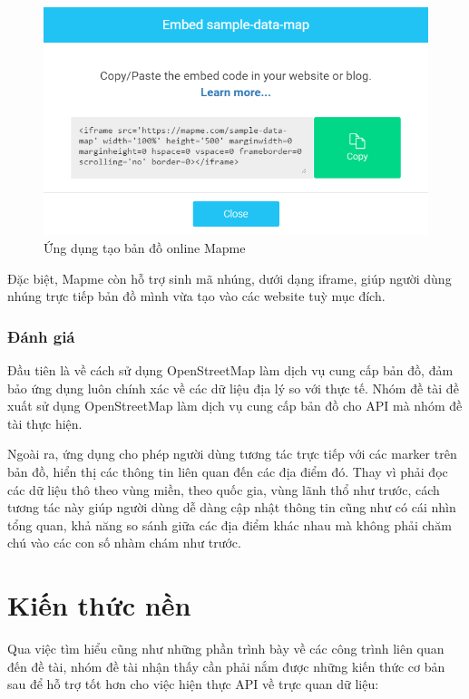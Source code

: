 \documentclass[12pt,a4paper,oneside]{article}
\begin{document}
\begin{figure}[htp]
	\begin{center}
    \includegraphics[scale=.8]{image/mapmeExport}
    \caption{Ứng dụng tạo bản đồ online Mapme}
    \label{refhinh12}
	\end{center}
\end{figure}

Đặc biệt, Mapme còn hỗ trợ sinh mã nhúng, dưới dạng iframe, giúp người dùng nhúng trực tiếp bản đồ mình vừa tạo vào các website tuỳ mục đích.

\subsubsection{Đánh giá}
Đầu tiên là về cách sử dụng OpenStreetMap làm dịch vụ cung cấp bản đồ, đảm bảo ứng dụng luôn chính xác về các dữ liệu địa lý so với thực tế. Nhóm đề tài đề xuất sử dụng OpenStreetMap làm dịch vụ cung cấp bản đồ cho API mà nhóm đề tài thực hiện.

Ngoài ra, ứng dụng cho phép người dùng tương tác trực tiếp với các marker trên bản đồ, hiển thị các thông tin liên quan đến các địa điểm đó. Thay vì phải đọc các dữ liệu thô theo vùng miền, theo quốc gia, vùng lãnh thổ như trước, cách tương tác này giúp người dùng dễ dàng cập nhật thông tin cũng như có cái nhìn tổng quan, khả năng so sánh giữa các địa điểm khác nhau mà không phải chăm chú vào các con số nhàm chám như trước.

\section{Kiến thức nền}
Qua việc tìm hiểu cũng như những phần trình bày về các công trình liên quan đến đề tài, nhóm đề tài nhận thấy cần phải nắm được những kiến thức cơ bản sau để hỗ trợ tốt hơn cho việc hiện thực API về trực quan dữ liệu:
\end{document}

